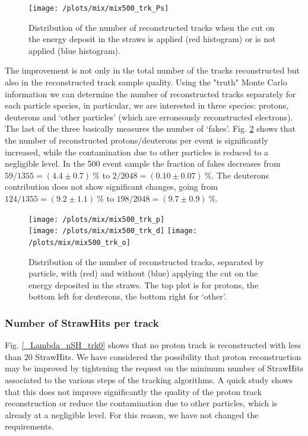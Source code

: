 \documentclass[12pt,a4paper,openright, oneside, titlepage]{book} %
\begin{document}
\begin{figure}[!htb]
\centering
\texttt{[image: /plots/mix/mix500\_trk\_Ps]}
\caption[Number of tracks with and without the cut on the StrawHit energy]
{Distribution of the number of reconstructed tracks when the cut on the energy deposit 
in the straws is applied (red histogram) or is not applied (blue histogram).}
\label{_mix_proton_trk}
\end{figure}

\noindent The improvement is not only in the total number of the tracks reconstructed but also in the reconstructed track sample quality. 
Using the "truth" Monte Carlo information we can determine the number of reconstructed tracks separately for each particle species, in particular, we are interested in three species: protons, deuterons and `other particles' (which are erroneously reconstructed electrons).
The last of the three basically measures the number of `fakes'.
Fig. \ref{_mix_pdgID_trk} shows that the number of reconstructed protons/deuterons per event is significantly increased, while the contamination due to other particles is reduced to a negligible level.
In the 500 event sample the fraction of fakes decreases from $59/1355=(4.4\pm0.7)\ \%$ to $2/2048=(0.10\pm0.07)\ \%$.
The deuterons contribution does not show significant changes, going from $124/1355= (9.2\pm1.1)\ \%$  to $198/2048=(9.7\pm0.9)\ \%$.

\begin{figure}[!htb]
\centering
\texttt{[image: /plots/mix/mix500\_trk\_p]}\\
\texttt{[image: /plots/mix/mix500\_trk\_d]}
\texttt{[image: /plots/mix/mix500\_trk\_o]}
\caption[Number of tracks from different particles]
{Distribution of the number of reconstructed tracks, separated by particle, 
with (red) and without (blue) applying the cut on the energy deposited in the straws. 
The top plot is for protons, the bottom left for deuterons, the bottom right for `other'.}
\label{_mix_pdgID_trk}
\end{figure}

\subsubsection{Number of StrawHits per track}
Fig. \ref{_Lambda_nSH_trk0} shows that no proton track is reconstructed with less than $20$ StrawHits.
We have considered the possibility that proton reconstruction may be improved by tightening the
request on the minimum number of StrawHits associated to the various steps of the tracking algorithms.
A quick study shows that this does not improve significantly the quality of the proton track reconstruction or reduce the contamination due to other particles, which is already at a negligible level. 
For this reason, we have not changed the requirements.\\
\end{document}
